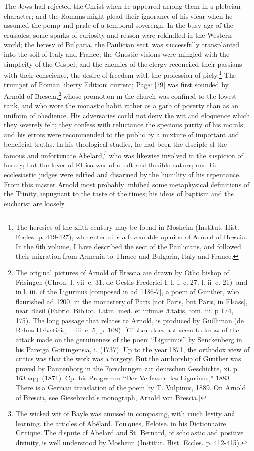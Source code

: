 The Jews had rejected the Christ when he appeared among them in a plebeian character; and the Romans might plead their ignorance of his vicar when he assumed the pomp and pride of a temporal sovereign. In the busy age of the crusades, some sparks of curiosity and reason were rekindled in the Western world; the heresy of Bulgaria, the Paulician sect, was successfully transplanted into the soil of Italy and France; the Gnostic visions were mingled with the simplicity of the Gospel; and the enemies of the clergy reconciled their passions with their conscience, the desire of freedom with the profession of piety.\footnote{The heresies of the xiith century may be found in Mosheim (Institut. Hist. Eccles. p. 419-427), who entertains a favourable opinion of Arnold of Brescia. In the 6th volume, I have described the sect of the Paulicians, and followed their migration from Armenia to Thrace and Bulgaria, Italy and France.} The trumpet of Roman liberty Edition: current; Page: [79] was first sounded by Arnold of Brescia,\footnote{The original pictures of Arnold of Brescia are drawn by Otho bishop of Frisingen (Chron. l. vii. c. 31, de Gestis Frederici I. l. i. c. 27, l. ii. c. 21), and in l. iii. of the Ligurinus [composed in ad 1186-7], a poem of Gunther, who flourished ad 1200, in the monastery of Paris [not Paris, but Päris, in Elsass], near Basil (Fabric. Bibliot. Latin. med. et infimæ Ætatis, tom. iii. p 174, 175). The long passage that relates to Arnold, is produced by Guilliman (de Rebus Helveticis, l. iii. c. 5, p. 108). [Gibbon does not seem to know of the attack made on the genuineness of the poem \texthebrew{“}Ligurinus\texthebrew{}” by Senckenberg in his Parerga Gottingensia, i. (1737). Up to the year 1871, the orthodox view of critics was that the work was a forgery. But the authorship of Gunther was proved by Pannenborg in the Forschungen zur deutschen Geschichte, xi. p. 163 sqq. (1871). Cp. his Programm \texthebrew{“}Der Verfasser des Ligurinus,\texthebrew{}” 1883. There is a German translation of the poem by T. Vulpinus, 1889. On Arnold of Brescia, see Giesebrecht\texthebrew{}’s monograph, Arnold von Brescia.]} whose promotion in the church was confined to the lowest rank, and who wore the monastic habit rather as a garb of poverty than as an uniform of obedience. His adversaries could not deny the wit and eloquence which they severely felt; they confess with reluctance the specious purity of his morals; and his errors were recommended to the public by a mixture of important and beneficial truths. In his theological studies, he had been the disciple of the famous and unfortunate Abelard,\footnote{The wicked wit of Bayle was amused in composing, with much levity and learning, the articles of Abélard, Foulques, Heloise, in his Dictionnaire Critique. The dispute of Abelard and St. Bernard, of scholastic and positive divinity, is well understood by Mosheim (Institut. Hist. Eccles. p. 412-415).} who was likewise involved in the suspicion of heresy; but the lover of Eloisa was of a soft and flexible nature; and his ecclesiastic judges were edified and disarmed by the humility of his repentance. From this master Arnold most probably imbibed some metaphysical definitions of the Trinity, repugnant to the taste of the times; his ideas of baptism and the eucharist are loosely 
